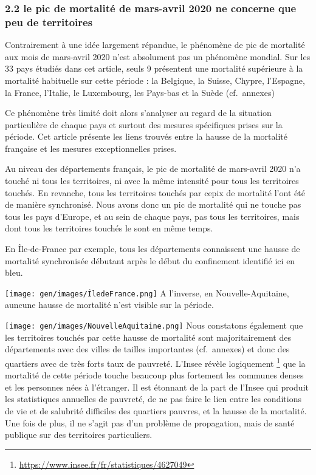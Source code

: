 \documentclass[
]{article}
\begin{document}
\hypertarget{le-pic-de-mortalituxe9-de-mars-avril-2020-ne-concerne-que-peu-de-territoires}{%
\subsubsection{2.2 le pic de mortalité de mars-avril 2020 ne concerne
que peu de
territoires}\label{le-pic-de-mortalituxe9-de-mars-avril-2020-ne-concerne-que-peu-de-territoires}}

Contrairement à une idée largement répandue, le phénomène de pic de
mortalité aux mois de mars-avril 2020 n'est absolument pas un phénomène
mondial. Sur les 33 pays étudiés dans cet article, seuls 9 présentent
une mortalité supérieure à la mortalité habituelle sur cette période :
la Belgique, la Suisse, Chypre, l'Espagne, la France, l'Italie, le
Luxembourg, les Pays-bas et la Suède (cf.~annexes)

Ce phénomène très limité doit alors s'analyser au regard de la situation
particulière de chaque pays et surtout des mesures spécifiques prises
sur la période. Cet article présente les liens trouvés entre la hausse
de la mortalité française et les mesures exceptionnelles prises.

Au niveau des départements français, le pic de mortalité de mars-avril
2020 n'a touché ni tous les territoires, ni avec la même intensité pour
tous les territoires touchés. En revanche, tous les territoires touchés
par cepix de mortalité l'ont été de manière synchronisé. Nous avons donc
un pic de mortalité qui ne touche pas tous les pays d'Europe, et au sein
de chaque pays, pas tous les territoires, mais dont tous les territoires
touchés le sont en même temps.

En Île-de-France par exemple, tous les départements connaissent une
hausse de mortalité synchronisée débutant arpès le début du confinement
identifié ici en bleu.

\texttt{[image: gen/images/ÎledeFrance.png]}
A l'inverse, en Nouvelle-Aquitaine, auncune hausse de mortalité n'est
visible sur la période.

\texttt{[image: gen/images/NouvelleAquitaine.png]}
Nous constatons également que les territoires touchés par cette hausse
de mortalité sont majoritairement des départements avec des villes de
tailles importantes (cf.~annexes) et donc des quartiers avec de très
forts taux de pauvreté. L'Insee révèle logiquement \footnote{\url{https://www.insee.fr/fr/statistiques/4627049}}
que la mortalité de cette période touche beaucoup plus fortement les
communes denses et les personnes nées à l'étranger. Il est étonnant de
la part de l'Insee qui produit les statistiques annuelles de pauvreté,
de ne pas faire le lien entre les conditions de vie et de salubrité
difficiles des quartiers pauvres, et la hausse de la mortalité. Une fois
de plus, il ne s'agit pas d'un problème de propagation, mais de santé
publique sur des territoires particuliers.
\end{document}
